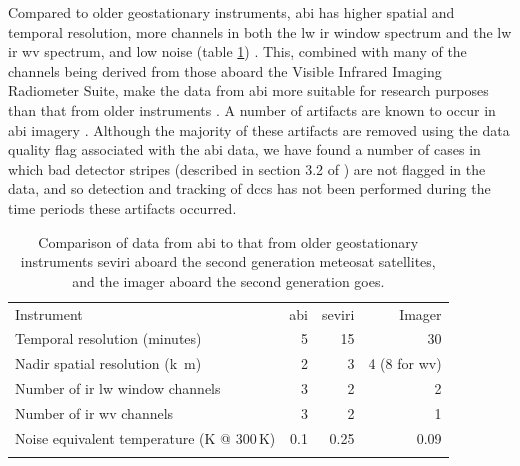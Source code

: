 Compared to older geostationary instruments, \acrshort{abi} has higher spatial and temporal resolution, more channels in both the \acrshort{lw} \acrshort{ir} window spectrum and the \acrshort{lw} \acrshort{ir} \acrfull{wv} spectrum, and low noise (table \ref{table:abi_comparison}) \citep{iacovazzi_goes-16_2020}.
This, combined with many of the channels being derived from those aboard the Visible Infrared Imaging Radiometer Suite, make the data from \acrshort{abi} more suitable for research purposes than that from older instruments \citep{heidinger_chapter_2020}.
A number of artifacts are known to occur in \acrshort{abi} imagery \citep{gunshor_goes-r_2020}.
Although the majority of these artifacts are removed using the data quality flag associated with the \acrshort{abi} data, we have found a number of cases in which bad detector stripes (described in section 3.2 of \citealp{gunshor_goes-r_2020}) are not flagged in the data, and so detection and tracking of \acrshort{dcc}s has not been performed during the time periods these artifacts occurred.


\begin{table}[tb]
\centering
\begin{tabular}{lrrr}
\tophline
Instrument                                              & \acrshort{abi}   & \acrshort{seviri}    & Imager \\
\middlehline
Temporal resolution (\unit{minutes})                    & 5     & 15        & 30 \\
Nadir spatial resolution (\unit{k m})                   & 2     & 3         & 4 (8 for \acrshort{wv}) \\
Number of \acrshort{ir} \acrshort{lw} window channels                         & 3     & 2         & 2 \\
Number of \acrshort{ir} \acrshort{wv} channels                                & 3     & 2         & 1 \\
Noise equivalent temperature  (\unit{K} @ 300\,\unit{K})  & 0.1   & 0.25      & 0.09 \\
\bottomhline
\end{tabular}
\caption[
Comparison of data from \acrshort{abi} to that from older geostationary instruments
]{
Comparison of data from \acrshort{abi} to that from older geostationary instruments\; \acrshort{seviri} aboard the second generation meteosat satellites, and the imager aboard the second generation \acrshort{goes}.
} %
\label{table:abi_comparison}
\end{table}


